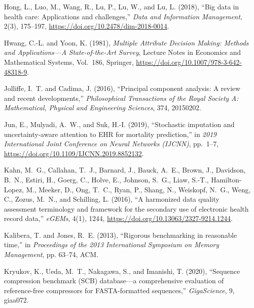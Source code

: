 \begin{thebibliography}{}
Hong, L., Luo, M., Wang, R., Lu, P., Lu, W., and Lu, L. (2018), \enquote{Big data in health care: Applications and challenges,} \emph{Data and Information Management}, 2(3), 175--197, \url{https://doi.org/10.2478/dim-2018-0014}.

Hwang, C.-L. and Yoon, K. (1981), \emph{Multiple Attribute Decision Making: Methods and Applications---A State-of-the-Art Survey}, Lecture Notes in Economics and Mathematical Systems, Vol.~186, Springer, \url{https://doi.org/10.1007/978-3-642-48318-9}.

Jolliffe, I.~T. and Cadima, J. (2016), \enquote{Principal component analysis: A review and recent developments,} \emph{Philosophical Transactions of the Royal Society A: Mathematical, Physical and Engineering Sciences}, 374, 20150202.

Jun, E., Mulyadi, A.~W., and Suk, H.-I. (2019), \enquote{Stochastic imputation and uncertainty-aware attention to EHR for mortality prediction,} in \emph{2019 International Joint Conference on Neural Networks (IJCNN)}, pp.~1--7, \url{https://doi.org/10.1109/IJCNN.2019.8852132}.

Kahn, M.~G., Callahan, T.~J., Barnard, J., Bauck, A.~E., Brown, J., Davidson, B.~N., Estiri, H., Goerg, C., Holve, E., Johnson, S.~G., Liaw, S.-T., Hamilton-Lopez, M., Meeker, D., Ong, T.~C., Ryan, P., Shang, N., Weiskopf, N.~G., Weng, C., Zozus, M.~N., and Schilling, L. (2016), \enquote{A harmonized data quality assessment terminology and framework for the secondary use of electronic health record data,} \emph{eGEMs}, 4(1), 1244, \url{https://doi.org/10.13063/2327-9214.1244}.

Kalibera, T. and Jones, R.~E. (2013), \enquote{Rigorous benchmarking in reasonable time,} in \emph{Proceedings of the 2013 International Symposium on Memory Management}, pp. 63--74, ACM.

Kryukov, K., Ueda, M.~T., Nakagawa, S., and Imanishi, T. (2020), \enquote{Sequence compression benchmark (SCB) database---a comprehensive evaluation of reference-free compressors for FASTA-formatted sequences,} \emph{GigaScience}, 9, giaa072.


\end{thebibliography}
